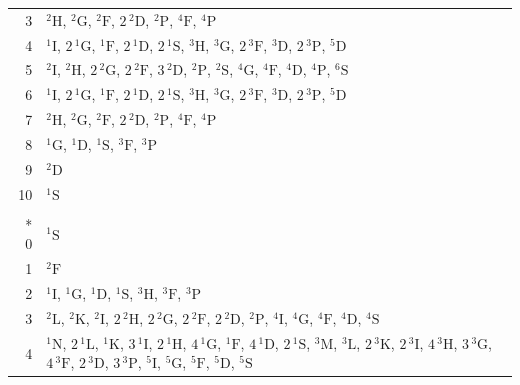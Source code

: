 \documentclass[10pt,a4paper]{article}
\makeatletter
\def\grouprule#1#2{\noalign{\marks\LTgroupmarks{\the\belowrulesep}\nobreak\vskip#1%
  \vskip\aboverulesep}\multispan\LT@cols\unskip{\leaders\hrule\@height#2\hfill\kern\z@}\cr
  \noalign{\penalty\LTrulebreak\vskip\belowrulesep\global\@lastruleclass\z@}}
\numberwithin{equation}{section}
\newcommand{\spec}[1]{\mathrm{#1}}
\newcommand{\orbital}[1]{\mathrm{#1}}
\newcommand{\term}[2]{{}^{#1}#2}
\newlength{\fillwidth}\newlength{\cellwidth}\newlength{\colwidth}
\makeatother
\begin{document}
{\begin{longtable}{@{}r>{\RaggedRight\arraybackslash}p{\fillwidth}@{}}
3 & $\term{2}{\spec{H}}$, $\term{2}{\spec{G}}$, $\term{2}{\spec{F}}$, $2\,\term{2}{\spec{D}}$, $\term{2}{\spec{P}}$, $\term{4}{\spec{F}}$, $\term{4}{\spec{P}}$\\
4 & $\term{1}{\spec{I}}$, $2\,\term{1}{\spec{G}}$, $\term{1}{\spec{F}}$, $2\,\term{1}{\spec{D}}$, $2\,\term{1}{\spec{S}}$, $\term{3}{\spec{H}}$, $\term{3}{\spec{G}}$, $2\,\term{3}{\spec{F}}$, $\term{3}{\spec{D}}$, $2\,\term{3}{\spec{P}}$, $\term{5}{\spec{D}}$\\
5 & $\term{2}{\spec{I}}$, $\term{2}{\spec{H}}$, $2\,\term{2}{\spec{G}}$, $2\,\term{2}{\spec{F}}$, $3\,\term{2}{\spec{D}}$, $\term{2}{\spec{P}}$, $\term{2}{\spec{S}}$, $\term{4}{\spec{G}}$, $\term{4}{\spec{F}}$, $\term{4}{\spec{D}}$, $\term{4}{\spec{P}}$, $\term{6}{\spec{S}}$\\
6 & $\term{1}{\spec{I}}$, $2\,\term{1}{\spec{G}}$, $\term{1}{\spec{F}}$, $2\,\term{1}{\spec{D}}$, $2\,\term{1}{\spec{S}}$, $\term{3}{\spec{H}}$, $\term{3}{\spec{G}}$, $2\,\term{3}{\spec{F}}$, $\term{3}{\spec{D}}$, $2\,\term{3}{\spec{P}}$, $\term{5}{\spec{D}}$\\
7 & $\term{2}{\spec{H}}$, $\term{2}{\spec{G}}$, $\term{2}{\spec{F}}$, $2\,\term{2}{\spec{D}}$, $\term{2}{\spec{P}}$, $\term{4}{\spec{F}}$, $\term{4}{\spec{P}}$\\
8 & $\term{1}{\spec{G}}$, $\term{1}{\spec{D}}$, $\term{1}{\spec{S}}$, $\term{3}{\spec{F}}$, $\term{3}{\spec{P}}$\\
9 & $\term{2}{\spec{D}}$\\
10 & $\term{1}{\spec{S}}$\\
\grouprule{0pt}{\lightrulewidth}\multicolumn{2}{@{}c@{}}{$\orbital{f}^{n}$, $l = 3$}\\*
0 & $\term{1}{\spec{S}}$\\
1 & $\term{2}{\spec{F}}$\\
2 & $\term{1}{\spec{I}}$, $\term{1}{\spec{G}}$, $\term{1}{\spec{D}}$, $\term{1}{\spec{S}}$, $\term{3}{\spec{H}}$, $\term{3}{\spec{F}}$, $\term{3}{\spec{P}}$\\
3 & $\term{2}{\spec{L}}$, $\term{2}{\spec{K}}$, $\term{2}{\spec{I}}$, $2\,\term{2}{\spec{H}}$, $2\,\term{2}{\spec{G}}$, $2\,\term{2}{\spec{F}}$, $2\,\term{2}{\spec{D}}$, $\term{2}{\spec{P}}$, $\term{4}{\spec{I}}$, $\term{4}{\spec{G}}$, $\term{4}{\spec{F}}$, $\term{4}{\spec{D}}$, $\term{4}{\spec{S}}$\\
4 & $\term{1}{\spec{N}}$, $2\,\term{1}{\spec{L}}$, $\term{1}{\spec{K}}$, $3\,\term{1}{\spec{I}}$, $2\,\term{1}{\spec{H}}$, $4\,\term{1}{\spec{G}}$, $\term{1}{\spec{F}}$, $4\,\term{1}{\spec{D}}$, $2\,\term{1}{\spec{S}}$, $\term{3}{\spec{M}}$, $\term{3}{\spec{L}}$, $2\,\term{3}{\spec{K}}$, $2\,\term{3}{\spec{I}}$, $4\,\term{3}{\spec{H}}$, $3\,\term{3}{\spec{G}}$, $4\,\term{3}{\spec{F}}$, $2\,\term{3}{\spec{D}}$, $3\,\term{3}{\spec{P}}$, $\term{5}{\spec{I}}$, $\term{5}{\spec{G}}$, $\term{5}{\spec{F}}$, $\term{5}{\spec{D}}$, $\term{5}{\spec{S}}$\\

\end{longtable}}
\end{document}
